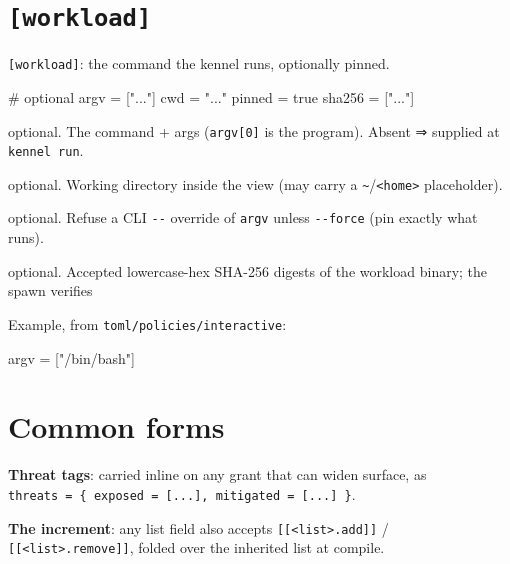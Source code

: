 \hypertarget{workload}{%
\section{\texorpdfstring{\texttt{{[}workload{]}}}{{[}workload{]}}}\label{workload}}

\texttt{{[}workload{]}}: the command the kennel runs, optionally pinned.

\begin{kennelcode}
[workload]
# optional
argv     = ["..."]
cwd      = "..."
pinned   = true
sha256   = ["..."]
\end{kennelcode}

\begin{description}
\tightlist
\item[\texttt{argv}]
optional. The command + args (\texttt{argv{[}0{]}} is the program).
Absent ⇒ supplied at \texttt{kennel\ run}.
\item[\texttt{cwd}]
optional. Working directory inside the view (may carry a
\texttt{\textasciitilde{}}/\texttt{\textless{}home\textgreater{}}
placeholder).
\item[\texttt{pinned}]
optional. Refuse a CLI \texttt{-\/-} override of \texttt{argv} unless
\texttt{-\/-force} (pin exactly what runs).
\item[\texttt{sha256}]
optional. Accepted lowercase-hex SHA-256 digests of the workload binary;
the spawn verifies
\end{description}

Example, from \texttt{toml/policies/interactive}:

\begin{kennelcode}
[workload]
argv = ["/bin/bash"]
\end{kennelcode}

\hypertarget{common-forms}{%
\section{Common forms}\label{common-forms}}

\textbf{Threat tags}: carried inline on any grant that can widen
surface, as
\texttt{threats\ =\ \{\ exposed\ =\ {[}...{]},\ mitigated\ =\ {[}...{]}\ \}}.

\textbf{The increment}: any list field also accepts
\texttt{{[}{[}\textless{}list\textgreater{}.add{]}{]}} /
\texttt{{[}{[}\textless{}list\textgreater{}.remove{]}{]}}, folded over
the inherited list at compile.
